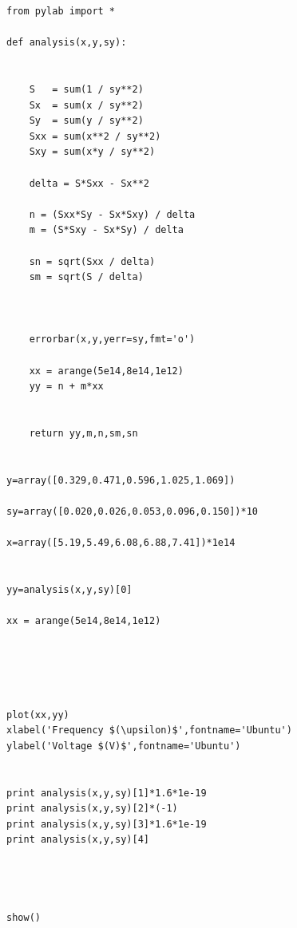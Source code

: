 \documentclass[aps,nofootinbib,onecolumn,groupedaddress,a4paper]{revtex4}
\begin{document}
\begin{lstlisting}
from pylab import *

def analysis(x,y,sy):

	
	S   = sum(1 / sy**2)
	Sx  = sum(x / sy**2)
	Sy  = sum(y / sy**2)
	Sxx = sum(x**2 / sy**2)
	Sxy = sum(x*y / sy**2)

	delta = S*Sxx - Sx**2

	n = (Sxx*Sy - Sx*Sxy) / delta
	m = (S*Sxy - Sx*Sy) / delta

	sn = sqrt(Sxx / delta)
	sm = sqrt(S / delta)



	errorbar(x,y,yerr=sy,fmt='o')

	xx = arange(5e14,8e14,1e12)
	yy = n + m*xx
	

	return yy,m,n,sm,sn


y=array([0.329,0.471,0.596,1.025,1.069])

sy=array([0.020,0.026,0.053,0.096,0.150])*10

x=array([5.19,5.49,6.08,6.88,7.41])*1e14

	
yy=analysis(x,y,sy)[0]

xx = arange(5e14,8e14,1e12)





plot(xx,yy)
xlabel('Frequency $(\upsilon)$',fontname='Ubuntu')
ylabel('Voltage $(V)$',fontname='Ubuntu')


print analysis(x,y,sy)[1]*1.6*1e-19
print analysis(x,y,sy)[2]*(-1)
print analysis(x,y,sy)[3]*1.6*1e-19
print analysis(x,y,sy)[4]




show()


\end{lstlisting}
\end{document}
